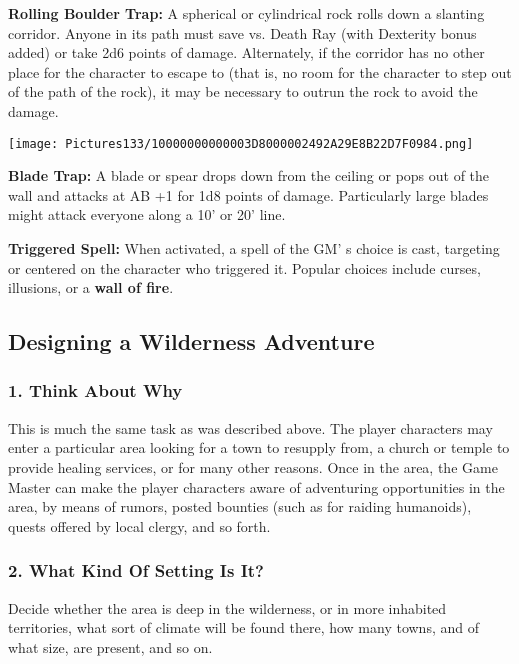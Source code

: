 \documentclass[a4paper,twoside,openany,10pt]{book}
\begin{document}
\begin{multicols}{2}
\textbf{Rolling Boulder Trap:} A spherical or cylindrical rock rolls down a slanting corridor. Anyone in its path must save vs. Death Ray (with Dexterity bonus added) or take 2d6 points of damage. Alternately, if the corridor has no other place for the character to escape to (that is, no room for the character to step out of the path of the rock), it may be necessary to outrun the rock to avoid the damage.

\begin{center}
	\texttt{[image: Pictures133/10000000000003D8000002492A29E8B22D7F0984.png]}
\end{center}

\textbf{Blade Trap:} A blade or spear drops down from the ceiling or pops out of the wall and attacks at AB +1 for 1d8 points of damage. Particularly large blades might attack everyone along a 10' or 20' line.

\textbf{Triggered Spell:} When activated, a spell of the GM' s choice is cast, targeting or centered on the character who triggered it. Popular choices include curses, illusions, or a \textbf{wall of fire}.

\subsection{Designing a Wilderness Adventure}\label{designing-a-wilderness-adventure}

\subsubsection{1. Think About Why}\label{think-about-why-1}

This is much the same task as was described above. The player characters may enter a particular area looking for a town to resupply from, a church or temple to provide healing services, or for many other reasons. Once in the area, the Game Master can make the player characters aware of adventuring opportunities in the area, by means of rumors, posted bounties (such as for raiding humanoids), quests offered by local clergy, and so forth.

\subsubsection{2. What Kind Of Setting Is It?}\label{what-kind-of-setting-is-it-1}

Decide whether the area is deep in the wilderness, or in more inhabited territories, what sort of climate will be found there, how many towns, and of what size, are present, and so on.


\end{multicols}
\end{document}
